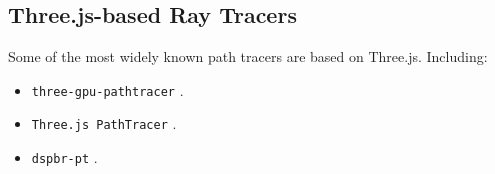 \subsection*{Three.js-based Ray Tracers}

Some of the most widely known path tracers are based on Three.js. Including:

\begin{itemize}
    \item {\texttt{three-gpu-pathtracer}} \cite{ThreeJsPathTracerJohnson}.
    \item{\texttt{Three.js PathTracer}} \cite{ThreeJsPathTracerLoftis}.
    \item {\texttt{dspbr-pt}} \cite{PathTracerDassault}.
  \end{itemize}
